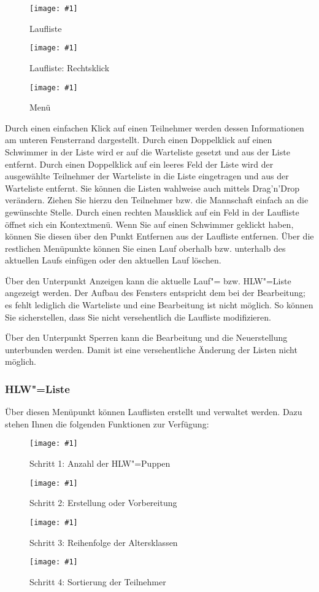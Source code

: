 \documentclass[11pt,a4paper,twoside,ngerman]{article}
\newcommand{\hsmimage}[3]{\begin{figure}[!ht]\centering\texttt{[image: \#1]}\caption{#3}\end{figure}}
\begin{document}
\hsmimage{pics/laufliste-bearbeiten}{.80\textwidth}{Laufliste}

\hsmimage{pics/laufliste-bearbeiten-popup}{.23\textwidth}{Laufliste: Rechtsklick}

\hsmimage{pics/laufliste-bearbeiten-menu}{.28\textwidth}{Menü}
Durch einen einfachen Klick auf einen Teilnehmer werden dessen Informationen am unteren Fensterrand dargestellt. Durch einen Doppelklick auf einen Schwimmer in der Liste wird er auf die Warteliste gesetzt und aus der Liste entfernt. Durch einen Doppelklick auf ein leeres Feld der Liste wird der ausgewählte Teilnehmer der Warteliste in die Liste eingetragen und aus der Warteliste entfernt. Sie können die Listen wahlweise auch mittels Drag'n'Drop verändern. Ziehen Sie hierzu den Teilnehmer bzw. die Mannschaft einfach an die gewünschte Stelle. Durch einen rechten Mausklick auf ein Feld in der Laufliste öffnet sich ein Kontextmenü. Wenn Sie auf einen Schwimmer geklickt haben, können Sie diesen über den Punkt \glqq{}Entfernen\grqq{} aus der Laufliste entfernen. Über die restlichen Menüpunkte können Sie einen Lauf oberhalb bzw. unterhalb des aktuellen Laufs einfügen oder den aktuellen Lauf löschen.

Über den Unterpunkt \glqq{}Anzeigen\grqq{} kann die aktuelle Lauf"= bzw. HLW"=Liste angezeigt werden. Der Aufbau des Fensters entspricht dem bei der Bearbeitung; es fehlt lediglich die Warteliste und eine Bearbeitung ist nicht möglich. So können Sie sicherstellen, dass Sie nicht versehentlich die Laufliste modifizieren.

Über den Unterpunkt \glqq{}Sperren\grqq{} kann die Bearbeitung und die Neuerstellung unterbunden werden. Damit ist eine versehentliche Änderung der Listen nicht möglich.


\subsubsection*{HLW"=Liste}
Über diesen Menüpunkt können Lauflisten erstellt und verwaltet werden. Dazu stehen Ihnen die folgenden Funktionen zur Verfügung:


\hsmimage{pics/hlw-liste-neu-1}{.51\textwidth}{Schritt 1: Anzahl der HLW"=Puppen}

\hsmimage{pics/hlw-liste-neu-2}{.51\textwidth}{Schritt 2: Erstellung oder Vorbereitung}

\hsmimage{pics/hlw-liste-neu-3}{.51\textwidth}{Schritt 3: Reihenfolge der Altersklassen}

\hsmimage{pics/hlw-liste-neu-4}{.51\textwidth}{Schritt 4: Sortierung der Teilnehmer}
\end{document}
